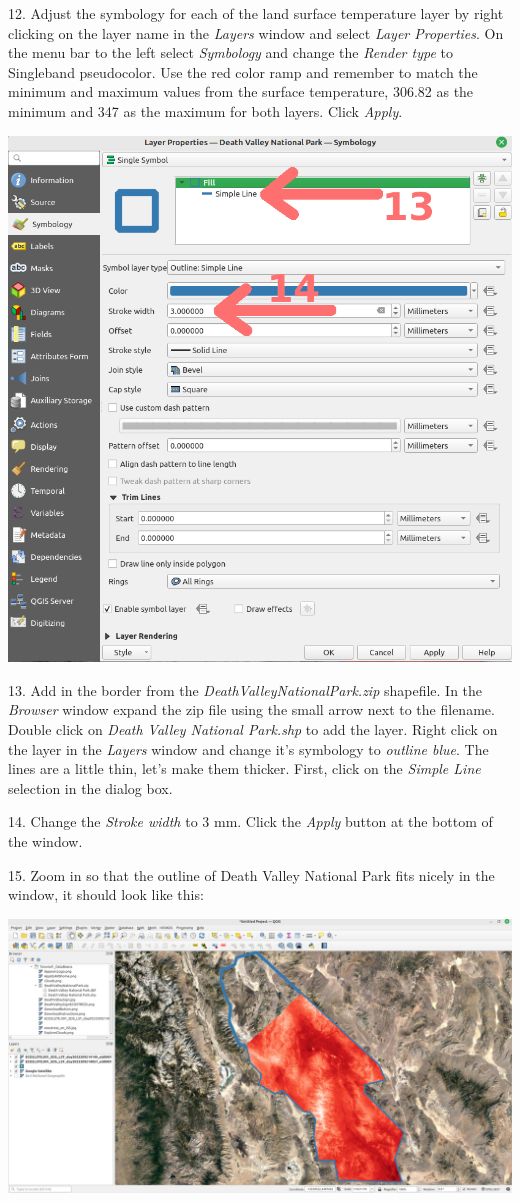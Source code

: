 \documentclass[oneside,a4paper,11pt,explicit]{book}
\begin{document}
12. Adjust the symbology for each of the land surface temperature layer by right clicking on the layer name in the \textit{Layers} window and select \textit{Layer Properties}. On the menu bar to the left select \textit{Symbology} and change the \textit{Render type} to Singleband pseudocolor. Use the red color ramp and remember to match the minimum and maximum values from the surface temperature, 306.82 as the minimum and 347 as the maximum for both layers. Click \textit{Apply}.

\centerline{\includegraphics[width=.625\textwidth]{DVlines.png}}

13. Add in the border from the \textit{DeathValleyNationalPark.zip} shapefile. In the \textit{Browser} window expand the zip file using the small arrow next to the filename. Double click on \textit{Death Valley National Park.shp} to add the layer. Right click on the layer in the \textit{Layers} window and change it's symbology to \textit{outline blue}. The lines are a little thin, let's make them thicker. First, click on the \textit{Simple Line} selection in the dialog box.

14. Change the \textit{Stroke width} to 3 mm. Click the \textit{Apply} button at the bottom of the window.

15. Zoom in so that the outline of Death Valley National Park fits nicely in the window, it should look like this:

\vspace{.25em}

\centerline{\includegraphics[width=\textwidth]{DV_LST.png}}
\end{document}
